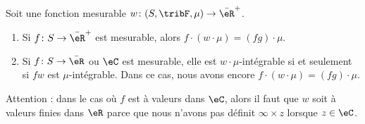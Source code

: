 \begin{proposition}  \label{PropooJMWAooDzfpmB}
    Soit une fonction mesurable \( w\colon (S,\tribF,\mu)\to \bar \eR^+\).
    \begin{enumerate}
        \item
            Si $f\colon S\to \bar\eR^+$ est mesurable, alors \( f\cdot(w\cdot \mu)=(fg)\cdot \mu\).
        \item
            Si \( f\colon S\to \bar \eR\) ou \( \eC\) est mesurable, elle est \( w\cdot\mu\)-intégrable si et seulement si \( fw\) est \( \mu\)-intégrable. Dans ce cas, nous avons encore \( f\cdot(w\cdot \mu)=(fg)\cdot\mu\).
    \end{enumerate}
    Attention : dans le cas où \( f\) est à valeurs dans \( \eC\), alors il faut que \( w\) soit à valeurs finies dans \( \eR\) parce que nous n'avons pas définit \( \infty\times z\) lorsque \( z\in \eC\).
\end{proposition}

